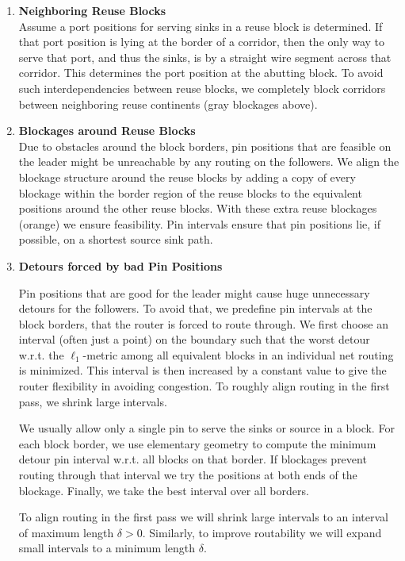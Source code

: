\documentclass[a2paper]{bigsposter}
\begin{document}
\begin{blockrow}
\begin{enumerate}
\item \textbf{Neighboring Reuse Blocks}\\
Assume a port positions for serving sinks in a reuse block is determined. If that port position is lying at the border of a corridor, then the only way to serve that port, and thus the sinks, is by a straight wire segment across that corridor. This determines the port position at the abutting block. To avoid such interdependencies between reuse blocks, we completely block corridors between neighboring reuse continents (gray blockages above).  %
\item \textbf{Blockages around Reuse Blocks}\\
Due to obstacles around the block borders, pin positions that are feasible on the leader might be unreachable by any routing on the followers.
We align the blockage structure around the reuse blocks by adding a copy of every blockage within the border region of the reuse blocks to the equivalent positions around the other reuse blocks. With these extra reuse blockages (orange)  we ensure feasibility. Pin intervals ensure that pin positions lie, if possible, on a shortest source sink path.
\item \textbf{Detours forced by bad Pin Positions}\\	
 \begin{minipage}{0.5\blockwidth}
Pin positions that are good for the leader might cause huge unnecessary detours  for the followers. 
To avoid that, we predefine pin intervals at the block borders, that the router is forced to route through.
We first choose an interval (often just a point) on the boundary such that the worst detour w.r.t. the  $\ell_1$-metric among all equivalent blocks in an individual net routing is minimized.
This interval is then increased  by a constant value to give the router flexibility in avoiding congestion. To roughly align routing in the first pass, we shrink large intervals.

We usually allow only a single pin to serve the sinks or source in a block.
For each block border, we use elementary geometry to compute the minimum detour pin interval w.r.t. all blocks on that border.  If blockages prevent
routing through that interval we try the positions at both ends of the
blockage.  Finally, we take the best interval over all borders.

To align routing in the first pass we will shrink large intervals to an interval of maximum  length $\delta>0$.
Similarly, to improve routability we will expand small intervals to a minimum length $\delta$.


\end{minipage}
\end{enumerate}
\end{blockrow}
\end{document}
